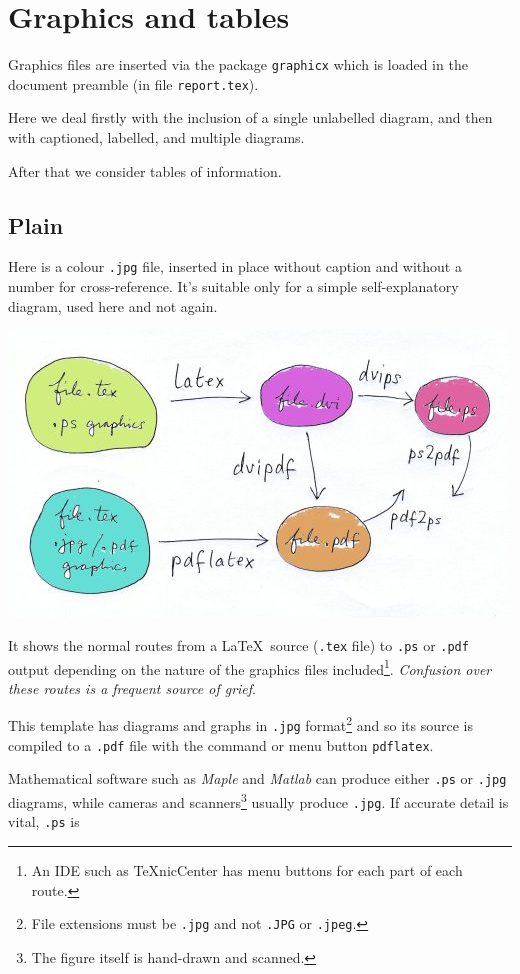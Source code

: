 \chapter{Graphics and tables}\label{sec:graphics}
Graphics files are inserted via the package \texttt{graphicx} which is
loaded in the document preamble (in file \texttt{report.tex}).
\par
Here we deal firstly with the inclusion of a single unlabelled diagram,
and then with captioned, labelled, and multiple diagrams.
\par
After that we consider tables of information.
%
\section{Plain}
Here is a colour \texttt{.jpg} file, inserted in place without caption
and without a number for cross-reference. It's suitable only for a
simple self-explanatory diagram, used here and not again.
\begin{center}
\includegraphics[width=.7\textwidth]{pic1.jpg}
\end{center}
It shows the normal routes from a \LaTeX\ source (\texttt{.tex} file) to
\texttt{.ps} or \texttt{.pdf} output depending on the nature of the
graphics files included\footnote{An IDE such as TeXnicCenter has menu
buttons for each part of each route.}. \textit{Confusion over these
routes is a frequent source of grief}.
\par
This template has diagrams and graphs in \texttt{.jpg}
format\footnote{File extensions must be \texttt{.jpg} and not
\texttt{.JPG} or \texttt{.jpeg}.} and so its source is compiled to a
\texttt{.pdf} file with the command or menu button \texttt{pdflatex}.
\par
Mathematical software such as \textsl{Maple} and \textsl{Matlab} can
produce either \texttt{.ps} or \texttt{.jpg} diagrams, while cameras and
scanners\footnote{The figure itself is hand-drawn and scanned.} usually
produce \texttt{.jpg}. If accurate detail is vital, \texttt{.ps} is
